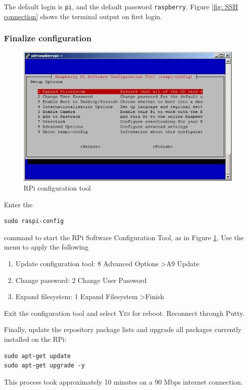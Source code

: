 \documentclass[a4paper,twoside,english]{report}
\newcommand{\noun}[1]{\textsc{#1}}
\begin{document}
The default login is \texttt{pi}, and the default password \texttt{raspberry}.
Figure \ref{fig: SSH connection} shows the terminal output on first
login.

\subsubsection{Finalize configuration}

\begin{figure}[h!]
\centering \includegraphics[scale=0.45]{fig/Rpi_finalize_install} \caption{RPi configuration tool}
\label{fig: RPi configuration tool} 
\end{figure}

Enter the\begin{verbatim}sudo raspi-config\end{verbatim}command to
start the RPi Software Configuration Tool, as in Figure \ref{fig: RPi configuration tool}.
Use the menu to apply the following
\begin{enumerate}
\item Update configuration tool: 8 Advanced Options \textgreater  A9 Update
\item Change password: 2 Change User Password
\item Expand filesystem: 1 Expand Filesystem \textgreater  Finish
\end{enumerate}
Exit the configuration tool and select \noun{Yes} for reboot. Reconnect
through Putty.

Finally, update the repository package lists and upgrade all packages
currently installed on the RPi:\begin{verbatim}sudo apt-get update
sudo apt-get upgrade -y\end{verbatim}This process took approximately 10 minutes on a 90 Mbps internet connection.
\end{document}
